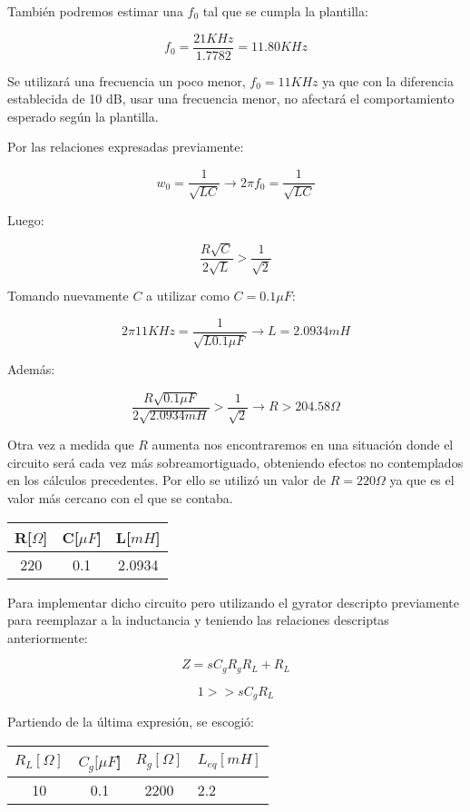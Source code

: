 También podremos estimar una $f_0$ tal que se cumpla la plantilla:

$$f_0 = \frac{21KHz}{1.7782} = 11.80 KHz$$

Se utilizará una frecuencia un poco menor, $f_0=11 KHz$ ya que con la diferencia establecida de 10 dB, usar una frecuencia menor, no afectará el comportamiento 
esperado según la plantilla.

Por las relaciones expresadas previamente:

$$w_0=\frac{1}{\sqrt{LC}} \longrightarrow 2\pi f_0=\frac{1}{\sqrt{LC}}$$

Luego:

$$\frac{R\sqrt{C}}{2\sqrt{L}} > \frac{1}{\sqrt{2}}$$

Tomando nuevamente $C$ a utilizar como $C=0.1\mu F$: 

$$2\pi 11KHz=\frac{1}{\sqrt{L0.1 \mu F}} \longrightarrow L = 2.0934 mH$$

Además:

$$\frac{R\sqrt{0.1\mu F}}{2\sqrt{2.0934mH}} > \frac{1}{\sqrt{2}} \longrightarrow R > 204.58 \Omega $$

Otra vez a medida que $R$ aumenta nos encontraremos en una situación donde el circuito será
cada vez más sobreamortiguado, obteniendo efectos no contemplados en los cálculos precedentes. 
Por ello se utilizó un valor de $R= 220 \Omega$ ya que es el valor más cercano con el que se contaba.

\begin{table}[H]
    \centering
    \begin{tabular}{|c|c|c|}
    \hline
    \rowcolor[HTML]{C0C0C0} 
    R[$\Omega$] & C[$\mu F$] & L[$mH$]  \\ \hline
    220     & 0.1  & 2.0934 \\ \hline
    \end{tabular}
    \end{table}

Para implementar dicho circuito pero utilizando el gyrator descripto previamente
para reemplazar a la inductancia y teniendo las relaciones descriptas anteriormente:

$$Z=sC_gR_gR_L+R_L$$

$$1 >> sC_gR_L$$

Partiendo de la última expresión, se escogió:

\begin{table}[H]
    \centering
    \begin{tabular}{|c|c|c|l|}
    \hline
    \rowcolor[HTML]{C0C0C0} 
    $R_L[\Omega]$ & $C_g[\mu F$] & $R_g[\Omega]$  & $L_{eq}[mH]$ \\ \hline
    10      & 0.1  & 2200 & 2.2        \\ \hline
    \end{tabular}
    \end{table}

